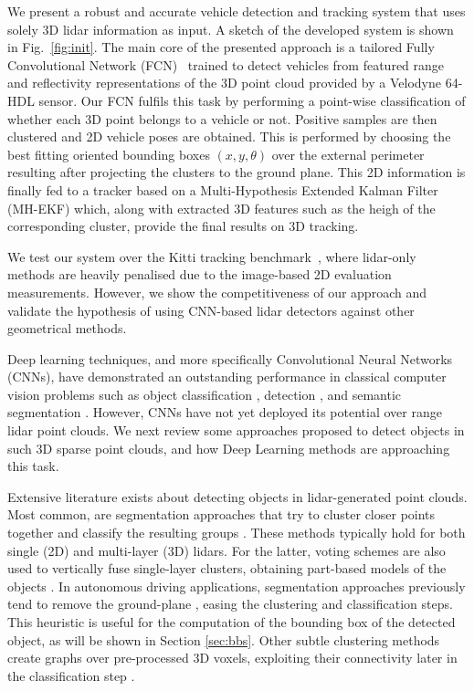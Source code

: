 \documentclass[letterpaper, 10 pt, conference]{ieeeconf}  %
\begin{document}
We present a robust and accurate vehicle detection and tracking system that uses solely 3D lidar information as input. A sketch of the developed system is shown in Fig.~\ref{fig:init}.
The main core of the presented approach is a tailored Fully Convolutional Network (FCN)~\cite{long2015fully} trained to detect vehicles from featured range and reflectivity representations of the 3D point cloud provided by a Velodyne 64-HDL sensor. 
Our FCN fulfils this task by performing a point-wise classification of whether each 3D point belongs to a vehicle or not. 
Positive samples are then clustered and 2D vehicle poses are obtained. This is performed by choosing the best fitting oriented bounding boxes $(x,y,\theta)$ over the external perimeter resulting after projecting the clusters to the ground plane.
This 2D information is finally fed to a tracker based on a Multi-Hypothesis Extended Kalman Filter (MH-EKF) which, along with extracted 3D features such as the heigh of the corresponding cluster, provide the final results on 3D tracking. 

We test our system over the Kitti tracking benchmark~\cite{Geiger2012CVPR}, where lidar-only methods are heavily penalised due to the image-based 2D evaluation measurements. However, we show the competitiveness of our approach and validate the hypothesis of using CNN-based lidar detectors against other geometrical methods. 

Deep learning techniques, and more specifically Convolutional Neural Networks (CNNs), have demonstrated an outstanding performance in classical computer vision problems such as object classification \cite{krizhevsky2012imagenet, he2016residual}, detection \cite{ren2015faster, sermanet2014overfeat}, and semantic segmentation \cite{long2015fully}. However, CNNs have not yet deployed its potential over range lidar point clouds. 
We next review some approaches proposed to detect objects in such 3D sparse point clouds, and how Deep Learning methods are approaching this task. 
 
 
Extensive literature exists about detecting objects in lidar-generated point clouds. Most common, are segmentation approaches that try to cluster closer points together and classify the resulting groups \cite{arras2007using, vaquero2016low, douillard2011segmentation, mertz2013moving}. These methods typically hold for both single (2D) and multi-layer (3D) lidars. For the latter, voting schemes are also used to vertically fuse single-layer clusters, obtaining part-based models of the objects \cite{mozos2010multi, spinello2010layered}. 
In autonomous driving applications, segmentation approaches previously tend to remove the ground-plane \cite{petrovskaya2009model, teichman2011towards}, easing the clustering and classification steps. This heuristic is useful for the computation of the bounding box of the detected object, as will be shown in Section \ref{sec:bbs}.
Other subtle clustering methods create graphs over pre-processed 3D voxels, exploiting their connectivity later in the classification step \cite{wang2012could, triebel2010segmentation, papon2013voxel}.
\end{document}
